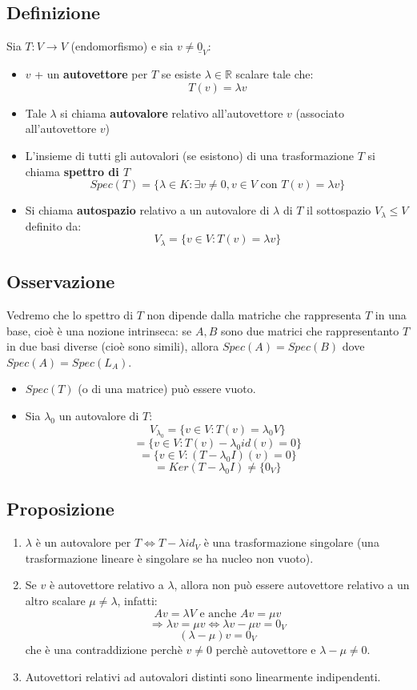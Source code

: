 \subsection{Definizione}
Sia $T:V\rightarrow V$ (endomorfismo) e sia $v\neq\underline{0}_V$:
\begin{itemize}
\item $v$ + un \textbf{autovettore} per $T$ se esiste $\lambda\in\mathbb{R}$ scalare tale che:
  \[T(v)=\lambda v\]
\item Tale $\lambda$ si chiama \textbf{autovalore} relativo all'autovettore $v$ (associato all'autovettore $v$)
\item L'insieme di tutti gli autovalori (se esistono) di una trasformazione $T$ si chiama \textbf{spettro di $T$}
  \[Spec(T)=\{\lambda\in K:\exists v\neq 0, v\in V\text{ con } T(v)=\lambda v\}\]

\item Si chiama \textbf{autospazio} relativo a un autovalore di $\lambda$ di $T$ il sottospazio $V_\lambda \leq V$ definito da:
  \[V_\lambda=\{v\in V:T(v)=\lambda v\}\]

\end{itemize}

\subsection{Osservazione}
Vedremo che lo spettro di $T$ non dipende dalla matriche che rappresenta $T$ in una base, cioè è una nozione intrinseca: se $A,B$ sono due matrici che rappresentanto $T$ in due basi diverse (cioè sono simili), allora $Spec(A)=Spec(B)$ dove $Spec(A)=Spec(L_A)$.
\begin{itemize}
\item $Spec(T)$ (o di una matrice) può essere vuoto.
\item Sia $\lambda_0$ un autovalore di $T$:
  \[V_{\lambda_0}=\{v\in V: T(v)=\lambda_0 V\}\]
  \[=\{v\in V: T(v)-\lambda_0id(v)=0\}\]
  \[=\{v\in V:(T-\lambda_0I)(v)=0\}\]
  \[=Ker(T-\lambda_0I)\neq\{0_V\}\]
\end{itemize}

\subsection{Proposizione}
\begin{enumerate}
\item $\lambda$ è un autovalore per $T\Leftrightarrow T-\lambda id_V$ è una trasformazione singolare (una trasformazione lineare è singolare se ha nucleo non vuoto).
\item Se $v$ è autovettore relativo a $\lambda$, allora non può essere autovettore relativo a un altro scalare $\mu\neq\lambda $, infatti:
  \[Av=\lambda V\text{ e anche } Av=\mu v\]
  \[\Rightarrow \lambda v=\mu v \Leftrightarrow \lambda v-\mu v=0_V\]
  \[(\lambda -\mu)v=0_V\]
  che è una contraddizione perchè $v\neq 0$ perchè autovettore e $\lambda-\mu\neq 0$.

  \item Autovettori relativi ad autovalori distinti sono linearmente indipendenti.

\end{enumerate}

